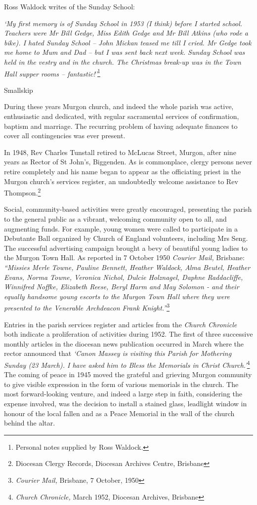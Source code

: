 Ross Waldock writes of the Sunday School:

\emph{`My first memory is of Sunday School in 1953 (I think) before I started school. Teachers were Mr Bill Gedge, Miss Edith Gedge and Mr Bill Atkins (who rode a bike). I hated Sunday School -- John Mickan teased me till I cried. Mr Gedge took me home to Mum and Dad -- but I was sent back next week. Sunday School was held in the vestry and in the church. The Christmas break-up was in the Town Hall supper rooms -- fantastic!'}\footnote{Personal notes supplied by Ross Waldock.}

Smallskip

During these years Murgon church, and indeed the whole parish was active, enthusiastic and dedicated, with regular sacramental services of confirmation, baptism and marriage. The recurring problem of having adequate finances to cover all contingencies was ever present.

In 1948, Rev Charles Tunstall retired to McLucas Street, Murgon, after nine years as Rector of St John's, Biggenden. As is commonplace, clergy persons never retire completely and his name began to appear as the officiating priest in the Murgon church's services register, an undoubtedly welcome assistance to Rev Thompson.\footnote{Diocesan Clergy Records, Diocesan Archives Centre, Brisbane}

Social, community-based activities were greatly encouraged, presenting the parish to the general public as a vibrant, welcoming community open to all, and augmenting funds. For example, young women were called to participate in a Debutante Ball organized by Church of England volunteers, including Mrs Seng. The successful advertising campaign brought a bevy of beautiful young ladies to the Murgon Town Hall. As reported in 7 October 1950 \emph{Courier Mail,} Brisbane: \emph{``Missies Merle Towne, Pauline Bennett, Heather Waldock, Alma Beutel, Heather Evans, Norma Towne, Veronica Nichol, Dulcie Holznagel, Daphne Raddacliffe, Winnifred Noffke, Elizabeth Reese, Beryl Harm and May Solomon - and their equally handsome young escorts to the Murgon Town Hall where they were presented to the Venerable Archdeacon Frank Knight.''}\footnote{\emph{Courier Mail,} Brisbane, 7 October, 1950}

Entries in the parish services register and articles from the \emph{Church Chronicle} both indicate a proliferation of activities during 1952. The first of three successive monthly articles in the diocesan news publication occurred in March where the rector announced that \emph{`Canon Massey is visiting this Parish for Mothering Sunday (23 March). I have asked him to Bless the Memorials in Christ Church.'}\footnote{\emph{Church Chronicle,} March 1952, Diocesan Archives, Brisbane} The coming of peace in 1945 moved the grateful and grieving Murgon community to give visible expression in the form of various memorials in the church. The most forward-looking venture, and indeed a large step in faith, considering the expense involved, was the decision to install a stained glass, leadlight window in honour of the local fallen and as a Peace Memorial in the wall of the church behind the altar.

